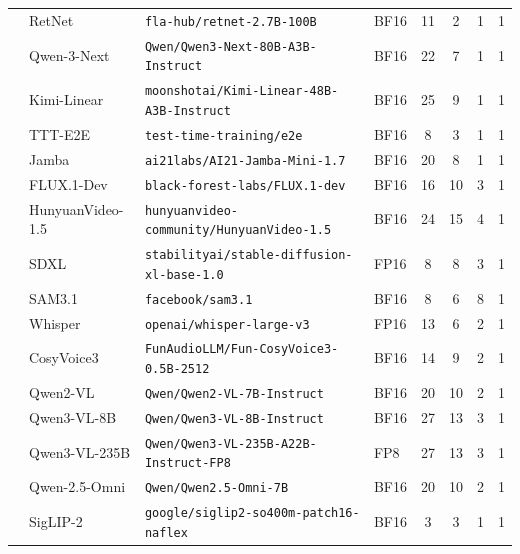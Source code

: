 \begin{table}[H]
\begin{tabular}{@{}ll>{\raggedright\arraybackslash}p{4.5cm}lcccc@{}}
   & RetNet             & \texttt{fla-hub/\allowbreak retnet-2.7B-100B}            & BF16 & 11 & 2 & 1 & 1 \\
   & Qwen-3-Next        & \texttt{Qwen/\allowbreak Qwen3-Next-80B-A3B-Instruct}    & BF16 & 22 & 7 & 1 & 1 \\
   & Kimi-Linear        & \texttt{moonshotai/\allowbreak Kimi-Linear-48B-A3B-Instruct} & BF16 & 25 & 9 & 1 & 1 \\
   & TTT-E2E            & \texttt{test-time-training/e2e}                          & BF16 & 8  & 3 & 1 & 1 \\
   & Jamba              & \texttt{ai21labs/\allowbreak AI21-Jamba-Mini-1.7}        & BF16 & 20 & 8 & 1 & 1 \\
  \midrule
   & FLUX.1-Dev         & \texttt{black-forest-labs/\allowbreak FLUX.1-dev}        & BF16 & 16 & 10 & 3 & 1 \\
   & HunyuanVideo-1.5   & \texttt{hunyuanvideo-community/\allowbreak HunyuanVideo-1.5} & BF16 & 24 & 15 & 4 & 1 \\
   & SDXL               & \texttt{stabilityai/\allowbreak stable-diffusion-xl-base-1.0} & FP16 & 8  & 8  & 3 & 1 \\
   & SAM3.1             & \texttt{facebook/\allowbreak sam3.1}                     & BF16 & 8  & 6  & 8 & 1 \\
   & Whisper            & \texttt{openai/\allowbreak whisper-large-v3}             & FP16 & 13 & 6  & 2 & 1 \\
   & CosyVoice3         & \texttt{FunAudioLLM/\allowbreak Fun-CosyVoice3-0.5B-2512} & BF16 & 14 & 9  & 2 & 1 \\
  \midrule
   & Qwen2-VL           & \texttt{Qwen/\allowbreak Qwen2-VL-7B-Instruct}           & BF16 & 20 & 10 & 2 & 1 \\
   & Qwen3-VL-8B        & \texttt{Qwen/\allowbreak Qwen3-VL-8B-Instruct}           & BF16 & 27 & 13 & 3 & 1 \\
   & Qwen3-VL-235B      & \texttt{Qwen/\allowbreak Qwen3-VL-235B-A22B-Instruct-FP8} & FP8  & 27 & 13 & 3 & 1 \\
   & Qwen-2.5-Omni      & \texttt{Qwen/\allowbreak Qwen2.5-Omni-7B}                & BF16 & 20 & 10 & 2 & 1 \\
   & SigLIP-2           & \texttt{google/\allowbreak siglip2-so400m-patch16-naflex} & BF16 & 3  & 3  & 1 & 1 \\

\end{tabular}
\end{table}
